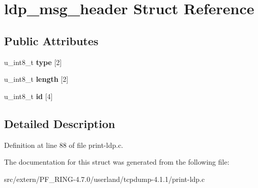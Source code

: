 \hypertarget{structldp__msg__header}{
\section{ldp\_\-msg\_\-header Struct Reference}
\label{structldp__msg__header}
}
\subsection*{Public Attributes}
\begin{DoxyCompactItemize}
\item 
\hypertarget{structldp__msg__header_abbe65676557764b4bde676e91dc2715e}{
u\_\-int8\_\-t {\bfseries type} \mbox{[}2\mbox{]}}
\label{structldp__msg__header_abbe65676557764b4bde676e91dc2715e}

\item 
\hypertarget{structldp__msg__header_a84024dacb98f6a3a283e534433dde2af}{
u\_\-int8\_\-t {\bfseries length} \mbox{[}2\mbox{]}}
\label{structldp__msg__header_a84024dacb98f6a3a283e534433dde2af}

\item 
\hypertarget{structldp__msg__header_abff253b95e1fa52b0bc82653aa0c4a68}{
u\_\-int8\_\-t {\bfseries id} \mbox{[}4\mbox{]}}
\label{structldp__msg__header_abff253b95e1fa52b0bc82653aa0c4a68}

\end{DoxyCompactItemize}


\subsection{Detailed Description}


Definition at line 88 of file print-\/ldp.c.



The documentation for this struct was generated from the following file:\begin{DoxyCompactItemize}
\item 
src/extern/PF\_\-RING-\/4.7.0/userland/tcpdump-\/4.1.1/print-\/ldp.c\end{DoxyCompactItemize}
